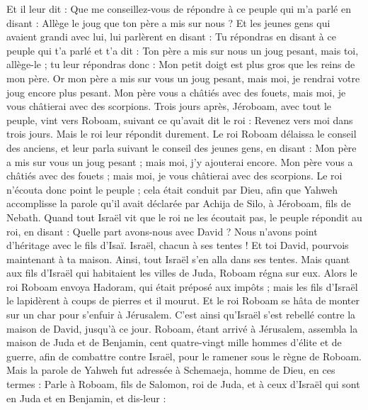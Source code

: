 \begin{multicols}{2}
Et il leur dit : Que me conseillez-vous de répondre à ce peuple qui m'a parlé en disant : Allège le joug que ton père a mis sur nous ?
Et les jeunes gens qui avaient grandi avec lui, lui parlèrent en disant : Tu répondras en disant à ce peuple qui t'a parlé et t'a dit : Ton père a mis sur nous un joug pesant, mais toi, allège-le ; tu leur répondras donc : Mon petit doigt est plus gros que les reins de mon père.
Or mon père a mis sur vous un joug pesant, mais moi, je rendrai votre joug encore plus pesant. Mon père vous a châtiés avec des fouets, mais moi, je vous châtierai avec des scorpions.
Trois jours après, Jéroboam, avec tout le peuple, vint vers Roboam, suivant ce qu'avait dit le roi : Revenez vers moi dans trois jours.
Mais le roi leur répondit durement. Le roi Roboam délaissa le conseil des anciens,
et leur parla suivant le conseil des jeunes gens, en disant : Mon père a mis sur vous un joug pesant ; mais moi, j'y ajouterai encore. Mon père vous a châtiés avec des fouets ; mais moi, je vous châtierai avec des scorpions.
Le roi n'écouta donc point le peuple ; cela était conduit par Dieu, afin que Yahweh accomplisse la parole qu'il avait déclarée par Achija de Silo, à Jéroboam, fils de Nebath.
Quand tout Israël vit que le roi ne les écoutait pas, le peuple répondit au roi, en disant : Quelle part avons-nous avec David ? Nous n'avons point d'héritage avec le fils d'Isaï. Israël, chacun à ses tentes ! Et toi David, pourvois maintenant à ta maison. Ainsi, tout Israël s'en alla dans ses tentes.
Mais quant aux fils d'Israël qui habitaient les villes de Juda, Roboam régna sur eux.
Alors le roi Roboam envoya Hadoram, qui était préposé aux impôts ; mais les fils d'Israël le lapidèrent à coups de pierres et il mourut. Et le roi Roboam se hâta de monter sur un char pour s'enfuir à Jérusalem.
C'est ainsi qu'Israël s'est rebellé contre la maison de David, jusqu'à ce jour.
\VerseOne{}Roboam, étant arrivé à Jérusalem, assembla la maison de Juda et de Benjamin, cent quatre-vingt mille hommes d'élite et de guerre, afin de combattre contre Israël, pour le ramener sous le règne de Roboam.
Mais la parole de Yahweh fut adressée à Schemaeja, homme de Dieu, en ces termes :
Parle à Roboam, fils de Salomon, roi de Juda, et à ceux d'Israël qui sont en Juda et en Benjamin, et dis-leur :

\end{multicols}

